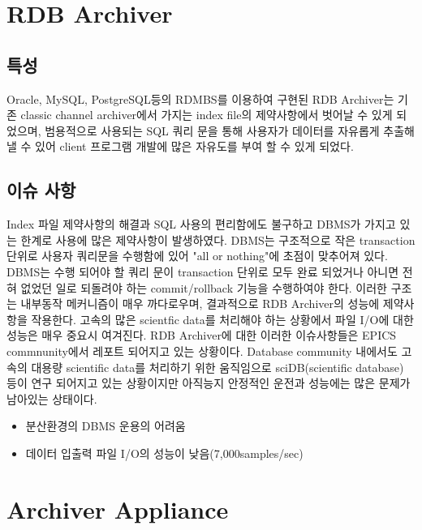 \documentclass[11pt
  , a4paper
  , article
  , oneside
]{memoir}
\begin{document}
\chapter{RDB Archiver}
\section{특성}
Oracle, MySQL, PostgreSQL등의 RDMBS를 이용하여 구현된 RDB Archiver\cite{rdbarchiver}는 기존 classic channel archiver에서 가지는 index file의 제약사항에서 벗어날 수 있게 되었으며, 범용적으로 사용되는 SQL 쿼리 문을 통해 사용자가 데이터를 자유롭게 추출해 낼 수 있어 client 프로그램 개발에 많은 자유도를 부여 할 수 있게 되었다.

\section{이슈 사항}
Index 파일 제약사항의 해결과 SQL 사용의 편리함에도 불구하고 DBMS가 가지고 있는 한계로 사용에 많은 제약사항이 발생하였다. DBMS는 구조적으로 작은 transaction 단위로 사용자 쿼리문을 수행함에 있어 "all or nothing"에 초점이 맞추어져 있다. DBMS는 수행 되어야 할 쿼리 문이 transaction 단위로 모두 완료 되었거나 아니면 전혀 없었던 일로 되돌려야 하는 commit/rollback 기능을 수행하여야 한다. 이러한 구조는 내부동작 메커니즘이 매우 까다로우며, 결과적으로 RDB Archiver의 성능에 제약사항을 작용한다. 고속의 많은 scientfic data를 처리해야 하는 상황에서 파일 I/O에 대한 성능은 매우 중요시 여겨진다. RDB Archiver에 대한 이러한 이슈사항들은 EPICS commnunity에서 레포트 되어지고 있는 상황이다.
Database community 내에서도 고속의 대용량 scientific data를 처리하기 위한 움직임으로 sciDB(scientific database)\cite{scidb} 등이 연구 되어지고 있는 상황이지만 아직능지 안정적인 운전과 성능에는 많은 문제가 남아있는 상태이다.

\begin{itemize}
	\item 분산환경의 DBMS 운용의 어려움
	\item 데이터 입출력 파일 I/O의 성능이 낮음(7,000samples/sec)
\end{itemize}

\chapter{Archiver Appliance}
\end{document}
